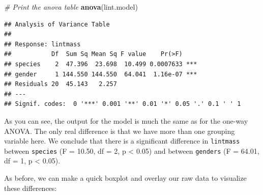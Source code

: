 \documentclass[
]{book}
\newenvironment{Shaded}{\begin{snugshade}}{\end{snugshade}}
\newcommand{\CommentTok}[1]{\textcolor[rgb]{0.56,0.35,0.01}{\textit{#1}}}
\newcommand{\DataTypeTok}[1]{\textcolor[rgb]{0.13,0.29,0.53}{#1}}
\newcommand{\DecValTok}[1]{\textcolor[rgb]{0.00,0.00,0.81}{#1}}
\newcommand{\KeywordTok}[1]{\textcolor[rgb]{0.13,0.29,0.53}{\textbf{#1}}}
\newcommand{\NormalTok}[1]{#1}
\newcommand{\OperatorTok}[1]{\textcolor[rgb]{0.81,0.36,0.00}{\textbf{#1}}}
\newcommand{\StringTok}[1]{\textcolor[rgb]{0.31,0.60,0.02}{#1}}
\begin{document}
\begin{Shaded}
\begin{Highlighting}[]
\CommentTok{# Print the anova table}
\KeywordTok{anova}\NormalTok{(lint.model)}
\end{Highlighting}
\end{Shaded}

\begin{verbatim}
## Analysis of Variance Table
## 
## Response: lintmass
##           Df  Sum Sq Mean Sq F value    Pr(>F)    
## species    2  47.396  23.698  10.499 0.0007633 ***
## gender     1 144.550 144.550  64.041  1.16e-07 ***
## Residuals 20  45.143   2.257                      
## ---
## Signif. codes:  0 '***' 0.001 '**' 0.01 '*' 0.05 '.' 0.1 ' ' 1
\end{verbatim}

As you can see, the output for the model is much the same as for the one-way ANOVA. The only real difference is that we have more than one grouping variable here. We conclude that there is a significant difference in \texttt{lintmass} between \texttt{species} (F = 10.50, df = 2, p \textless{} 0.05) and between \texttt{genders} (F = 64.01, df = 1, p \textless{} 0.05).

As before, we can make a quick boxplot and overlay our raw data to visualize these differences:

\begin{Shaded}
\end{Shaded}
\end{document}
